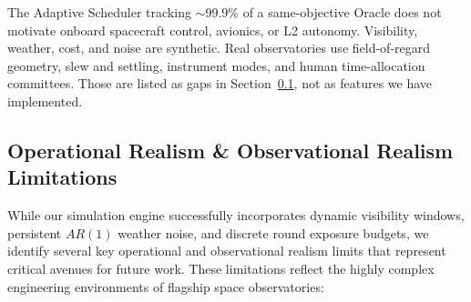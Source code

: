\documentclass[11pt,a4paper]{article}
\begin{document}
The Adaptive Scheduler tracking $\sim$99.9\% of a same-objective Oracle does not motivate onboard spacecraft control, avionics, or L2 autonomy. Visibility, weather, cost, and noise are synthetic. Real observatories use field-of-regard geometry, slew and settling, instrument modes, and human time-allocation committees. Those are listed as gaps in Section~\ref{sec:operational_realism}, not as features we have implemented.

\subsection{Operational Realism \& Observational Realism Limitations}
\label{sec:operational_realism}

While our simulation engine successfully incorporates dynamic visibility windows, persistent $AR(1)$ weather noise, and discrete round exposure budgets, we identify several key operational and observational realism limits that represent critical avenues for future work. These limitations reflect the highly complex engineering environments of flagship space observatories:
\end{document}
